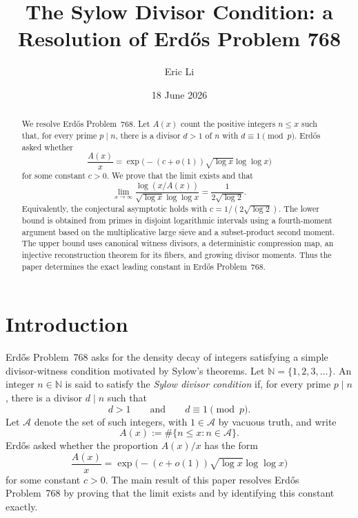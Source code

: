 \documentclass[11pt]{amsart}
\title[Erd\H{o}s Problem 768]{The Sylow Divisor Condition: a Resolution of Erd\H{o}s Problem 768}
\author[E. Li]{Eric Li}
\date{18 June 2026}
\theoremstyle{definition}
\theoremstyle{remark}
\numberwithin{equation}{section}
\newcommand{\N}{\mathbb N}
\newcommand{\Acal}{\mathcal A}
\begin{document}
\begin{abstract}
We resolve Erd\H{o}s Problem~768.  Let $A(x)$ count the positive integers
$n\le x$ such that, for every prime $p\mid n$, there is a divisor $d>1$ of
$n$ with $d\equiv1\pmod p$.  Erd\H{o}s asked whether
\[
 \frac{A(x)}x
 =\exp\!\bigl(-(c+o(1))\sqrt{\log x}\log\log x\bigr)
\]
for some constant $c>0$.  We prove that the limit exists and that
\[
 \lim_{x\to\infty}
 \frac{\log(x/A(x))}{\sqrt{\log x}\log\log x}
 =\frac1{2\sqrt{\log 2}}.
\]
Equivalently, the conjectural asymptotic holds with
$c=1/(2\sqrt{\log 2})$.  The lower bound is obtained from primes in disjoint
logarithmic intervals using a fourth-moment argument based on the
multiplicative large sieve and a subset-product second moment.  The upper
bound uses canonical witness divisors, a deterministic compression map, an
injective reconstruction theorem for its fibers, and growing divisor moments.
Thus the paper determines the exact leading constant in Erd\H{o}s Problem~768.
\end{abstract}

\maketitle

\section{Introduction}

Erd\H{o}s Problem~768 asks for the density decay of integers satisfying a
simple divisor-witness condition motivated by Sylow's theorems.  Let
$\N=\{1,2,3,\ldots\}$.  An integer $n\in\N$ is said to satisfy the
\emph{Sylow divisor condition} if, for every prime $p\mid n$, there is a
divisor $d\mid n$ such that
\begin{equation}\label{eq:def-condition}
 d>1\qquad\text{and}\qquad d\equiv1\pmod p.
\end{equation}
Let $\Acal$ denote the set of such integers, with $1\in\Acal$ by vacuous
truth, and write
\[
 A(x):=\#\{n\le x:n\in\Acal\}.
\]
Erd\H{o}s asked whether the proportion $A(x)/x$ has the form
\begin{equation}\label{eq:erdos-conjecture-intro}
 \frac{A(x)}x
 =\exp\!\bigl(-(c+o(1))\sqrt{\log x}\log\log x\bigr)
\end{equation}
for some constant $c>0$.  The main result of this paper resolves
Erd\H{o}s Problem~768 by proving that the limit exists and by identifying
this constant exactly.
\end{document}
